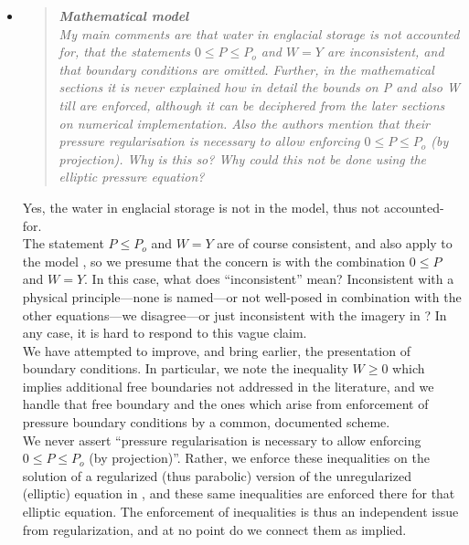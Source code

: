 \documentclass[11pt,reqno]{amsart}
\newcommand{\reply}[2]{
\medskip\medskip
\item  \begin{quote}
\emph{#1}
\end{quote}

\medskip
\noindent #2}
\begin{document}
\begin{itemize}
\reply{\textbf{Mathematical model}\\
My main comments are that water in englacial storage is not accounted for, that the statements $0 \le P \le P_o$ and $W = Y$ are inconsistent, and that boundary conditions are omitted. Further, in the mathematical sections it is never explained how in detail the bounds on P and also W till are enforced, although it can be deciphered from the later sections on numerical implementation. Also the authors mention that their pressure regularisation is necessary to allow enforcing $0 \le P \le P_o$ (by projection).  Why is this so? Why could this not be done using the elliptic pressure equation?}
{Yes, the water in englacial storage is not in the model, thus not accounted-for. \\
\indent The statement $P\le P_o$ and $W=Y$ are of course consistent, and also apply to the model \cite{Schoofetal2012}, so we presume that the concern is with the combination $0\le P$ and $W=Y$.  In this case, what does ``inconsistent'' mean?  Inconsistent with a physical principle---none is named---or not well-posed in combination with the other equations---we disagree---or just inconsistent with the imagery in \cite{Schoofetal2012}?  In any case, it is hard to respond to this vague claim.\\
\indent We have attempted to improve, and bring earlier, the presentation of boundary conditions.  In particular, we note the inequality $W\ge 0$ which implies additional free boundaries not addressed in the literature, and we handle that free boundary and the ones which arise from enforcement of pressure boundary conditions by a common, documented scheme.\\
\indent We never assert ``pressure regularisation is necessary to allow enforcing $0 \le P \le P_o$ (by projection)''.  Rather, we enforce these inequalities on the solution of a regularized (thus parabolic) version of the unregularized (elliptic) equation in \cite{Schoofetal2012}, and these same inequalities are enforced there for that elliptic equation.  The enforcement of inequalities is thus an independent issue from regularization, and at no point do we connect them as implied.}


\end{itemize}
\end{document}
